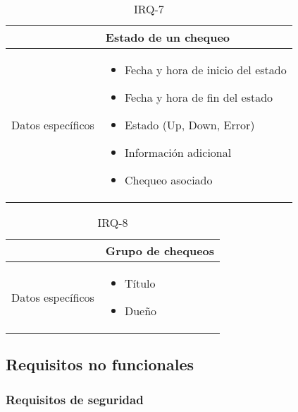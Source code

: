 \begin{table}[h!]
  \centering
  \begin{tabularx}{\textwidth}{|l|X|}
    \hline

    & Estado de un chequeo \\

    \hline
    Datos específicos &

    \begin{itemize}
    \item Fecha y hora de inicio del estado
    \item Fecha y hora de fin del estado
    \item Estado (Up, Down, Error)
    \item Información adicional
    \item Chequeo asociado
    \end{itemize}
    \\
    
    \hline
    
  \end{tabularx}
  \caption{IRQ-7}
\end{table}

\begin{table}[h!]
  \centering
  \begin{tabularx}{\textwidth}{|l|X|}
    \hline

    & Grupo de chequeos \\

    \hline
    Datos específicos &

    \begin{itemize}
      \item Título
      \item Dueño
    \end{itemize}
    \\
    
    \hline
    
  \end{tabularx}
  \caption{IRQ-8}
\end{table}

\FloatBarrier
\subsection{Requisitos no funcionales}

\subsubsection{Requisitos de seguridad}

